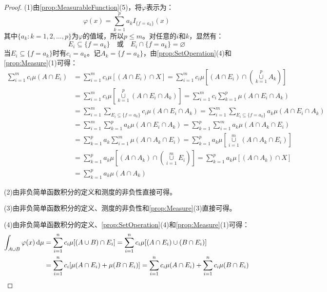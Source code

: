 \begin{proof}
	(1)由\cref{prop:MeasurableFunction}(5)，将$\varphi$表示为：
	\begin{equation*}
		\varphi(x)=\sum_{k=1}^{p}a_kI_{\{f=a_k\}}(x)
	\end{equation*}
	其中$\{a_k:k=1,2,\dots,p\}$为$\varphi$的值域，所以$p\leqslant m$。对任意的$i$和$k$，显然有：
	\begin{equation*}
		E_i\subseteq\{f=a_k\}\quad\text{或}\quad E_i\cap\{f=a_k\}=\varnothing
	\end{equation*}
	当$E_i\subseteq\{f=a_k\}$时有$c_i=a_k$。记$A_k=\{f=a_k\}$，由\cref{prop:SetOperation}(4)和\cref{prop:Measure}(1)可得：
	\begin{align*}
		\sum_{i=1}^{m}c_i\mu(A\cap E_i)
		&=\sum_{i=1}^{m}c_i\mu[(A\cap E_i)\cap X]
		=\sum_{i=1}^{m}c_i\mu\left[(A\cap E_i)\cap\left(\underset{k=1}{\overset{p}{\cup}}A_k\right)\right] \\
		&=\sum_{i=1}^{m}c_i\mu\left[\underset{k=1}{\overset{p}{\cup}}(A\cap E_i\cap A_k)\right]
		=\sum_{i=1}^{m}c_i\sum_{k=1}^{p}\mu(A\cap E_i\cap A_k) \\
		&=\sum_{i=1}^{m}\sum_{E_i\subseteq\{f=a_k\}}c_i\mu(A\cap E_i\cap A_k)
		=\sum_{i=1}^{m}\sum_{E_i\subseteq\{f=a_k\}}a_k\mu(A\cap E_i\cap A_k) \\
		&=\sum_{i=1}^{m}\sum_{k=1}^{p}a_k\mu(A\cap E_i\cap A_k)
		=\sum_{k=1}^{p}\sum_{i=1}^{m}a_k\mu(A\cap A_k\cap E_i) \\
		&=\sum_{k=1}^{p}a_k\sum_{i=1}^{m}\mu(A\cap A_k\cap E_i)
		=\sum_{k=1}^{p}a_k\mu\left[\underset{i=1}{\overset{m}{\cup}}(A\cap A_k\cap E_i)\right] \\
		&=\sum_{k=1}^{p}a_k\mu\left[(A\cap A_k)\cap\left(\underset{i=1}{\overset{m}{\cup}}E_i\right)\right]
		=\sum_{k=1}^{p}a_k\mu[(A\cap A_k)\cap X] \\
		&=\sum_{k=1}^{p}a_k\mu(A\cap A_k)
	\end{align*}\par
	(2)由非负简单函数积分的定义和测度的非负性直接可得。\par
	(3)由非负简单函数积分的定义、测度的非负性和\cref{prop:Measure}(3)直接可得。\par
	(4)由非负简单函数积分的定义、\cref{prop:SetOperation}(4)和\cref{prop:Measure}(1)可得：
	\begin{align*}
		\int_{A\cup B}\varphi(x)\dif\mu
		&=\sum_{i=1}^{n}c_i\mu[(A\cup B)\cap E_i]
		=\sum_{i=1}^{n}c_i\mu[(A\cap E_i)\cup(B\cap E_i)] \\
		&=\sum_{i=1}^{n}c_i[\mu(A\cap E_i)+\mu(B\cap E_i)]
		=\sum_{i=1}^{n}c_i\mu(A\cap E_i)+\sum_{i=1}^{n}c_i\mu(B\cap E_i) \\

\end{align*}
\end{proof}
